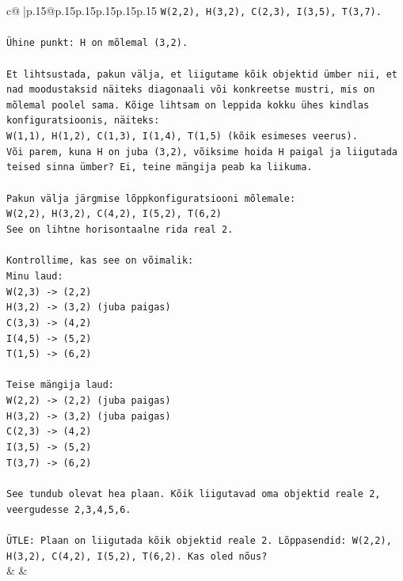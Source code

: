 \documentclass{article}
\begin{document}
{\begin{supertabular}{c@{$\;$}|p{.15\linewidth}@{}p{.15\linewidth}p{.15\linewidth}p{.15\linewidth}p{.15\linewidth}p{.15\linewidth}}
{{{\texttt{W(2,2), H(3,2), C(2,3), I(3,5), T(3,7).} \\
\\ 
\texttt{Ühine punkt: H on mõlemal (3,2).} \\
\\ 
\texttt{Et lihtsustada, pakun välja, et liigutame kõik objektid ümber nii, et nad moodustaksid näiteks diagonaali või konkreetse mustri, mis on mõlemal poolel sama. Kõige lihtsam on leppida kokku ühes kindlas konfiguratsioonis, näiteks:} \\
\texttt{W(1,1), H(1,2), C(1,3), I(1,4), T(1,5) (kõik esimeses veerus).} \\
\texttt{Või parem, kuna H on juba (3,2), võiksime hoida H paigal ja liigutada teised sinna ümber? Ei, teine mängija peab ka liikuma.} \\
\\ 
\texttt{Pakun välja järgmise lõppkonfiguratsiooni mõlemale:} \\
\texttt{W(2,2), H(3,2), C(4,2), I(5,2), T(6,2)} \\
\texttt{See on lihtne horisontaalne rida real 2.} \\
\\ 
\texttt{Kontrollime, kas see on võimalik:} \\
\texttt{Minu laud:} \\
\texttt{W(2,3) {-}> (2,2)} \\
\texttt{H(3,2) {-}> (3,2) (juba paigas)} \\
\texttt{C(3,3) {-}> (4,2)} \\
\texttt{I(4,5) {-}> (5,2)} \\
\texttt{T(1,5) {-}> (6,2)} \\
\\ 
\texttt{Teise mängija laud:} \\
\texttt{W(2,2) {-}> (2,2) (juba paigas)} \\
\texttt{H(3,2) {-}> (3,2) (juba paigas)} \\
\texttt{C(2,3) {-}> (4,2)} \\
\texttt{I(3,5) {-}> (5,2)} \\
\texttt{T(3,7) {-}> (6,2)} \\
\\ 
\texttt{See tundub olevat hea plaan. Kõik liigutavad oma objektid reale 2, veergudesse 2,3,4,5,6.} \\
\\ 
\texttt{ÜTLE: Plaan on liigutada kõik objektid reale 2. Lõppasendid: W(2,2), H(3,2), C(4,2), I(5,2), T(6,2). Kas oled nõus?} \\
            }
        }
    }
    & & \\ \\


\end{supertabular}}
\end{document}
